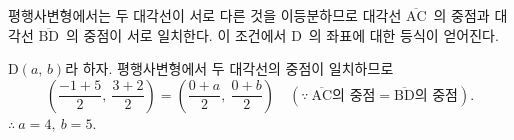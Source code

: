 \documentclass[10pt]{article}
\begin{document}
\begin{dmapproach}
평행사변형에서는 두 대각선이 서로 다른 것을 이등분하므로 대각선 $\overline{\mathrm{AC}}$\ 의 중점과 대각선 $\overline{\mathrm{BD}}$\ 의 중점이 서로 일치한다. 이 조건에서 $\mathrm{D}$\ 의 좌표에 대한 등식이 얻어진다.
\end{dmapproach}

\begin{dmsolution}
$\mathrm{D}(a,\, b)$라 하자. 평행사변형에서 두 대각선의 중점이 일치하므로
\begin{equation*}
  \left( \frac{-1 + 5}{2},\ \frac{3 + 2}{2} \right) = \left( \frac{0 + a}{2},\ \frac{0 + b}{2} \right) \quad(\because\ \overline{\mathrm{AC}}\text{의 중점} = \overline{\mathrm{BD}}\text{의 중점}).
\end{equation*}
$\therefore\ a = 4,\ b = 5$.
\end{dmsolution}

\dmchecktitle



\newpage

\dmconcepthead
{}
\end{document}
